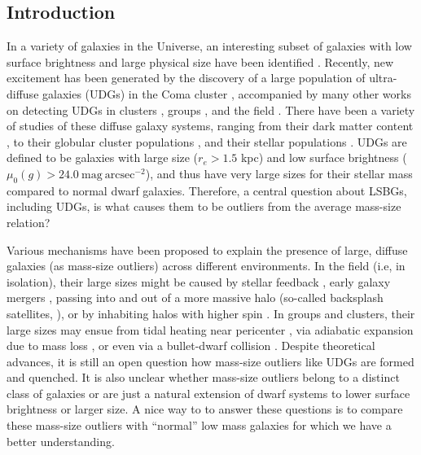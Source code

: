 \documentclass[twocolumn,astrosymb,twocolappendix]{aastex631}
\newcommand{\sbunit}{\mathrm{mag\ arcsec}^{-2}}
\newcommand{\sbcen}{\mu_{0}(g)}
\begin{document}
\begin{CJK*}{UTF8}{gbsn}


\section{Introduction} \label{sec:intro}
In a variety of galaxies in the Universe, an interesting subset of galaxies with low surface brightness and large physical size have been identified \citep[dubbed low surface brightness galaxies or LSBGs, e.g.,][]{Sandage1984,Caldwell1987,Impey1988,McGaugh1995,Dalcanton1997a}. Recently, new excitement has been generated by the discovery of a large population of ultra-diffuse galaxies (UDGs) in the Coma cluster \citep{vanDokkum2015}, accompanied by many other works on detecting UDGs in clusters \citep[e.g.,][]{Koda2015,Mihos2015,Yagi2016,vdBurg2016,vdBurg2017,Lee2017,ManceraPina2018,Zaritsky2019}, groups \citep[e.g.,][]{Roman2017b,Greco2018,SAGA-II,CarlstenELVES2022}, and the field \citep[e.g.,][]{Leisman2017,Roman2019,Prole2019,Tanoglidis2021,Kadowaki2021}. There have been a variety of studies of these diffuse galaxy systems, ranging from their dark matter content \citep[e.g.,][]{Mowla2017,vanDokkum2018,vanDokkum2019,Wasserman2019,Keim2022}, to their globular cluster populations \citep[e.g.,][]{vanDokkum2017,Somalwar2020,Forbes2020,Danieli2022,Gannon2022,vanDokkum2022GC}, and their stellar populations \citep[e.g.,][]{Gu2018,Ferre-Mateu2018,Villaume2022}. UDGs are defined to be galaxies with large size ($r_e > 1.5$ kpc) and low surface brightness ($\sbcen > 24.0\ \sbunit$), and thus have very large sizes for their stellar mass compared to normal dwarf galaxies. Therefore, a central question about LSBGs, including UDGs, is what causes them to be outliers from the average mass-size relation?

Various mechanisms have been proposed to explain the presence of large, diffuse galaxies (as mass-size outliers) across different environments. In the field (i.e, in isolation), their large sizes might be caused by stellar feedback \citep{DiCintio2017,Chan2018}, early galaxy mergers \citep{Wright2021}, passing into and out of a more massive halo (so-called backsplash satellites, \citealt{Benavides2021}), or by inhabiting halos with higher spin \citep{Dalcanton1997,Amorisco2016,Liao2019,Benavides2022}. In groups and clusters, their large sizes may ensue from tidal heating near pericenter \citep{Jiang2019}, via adiabatic expansion due to mass loss \citep{Tremmel2020}, or even via a bullet-dwarf collision \citep{vandokkum2022Nat,vanDokkum2022GC}. Despite theoretical advances, it is still an open question how mass-size outliers like UDGs are formed and quenched. It is also unclear whether mass-size outliers belong to a distinct class of galaxies or are just a natural extension of dwarf systems to lower surface brightness or larger size. A nice way to to answer these questions is to compare these mass-size outliers with ``normal'' low mass galaxies for which we have a better understanding. 



\end{CJK*}
\end{document}
